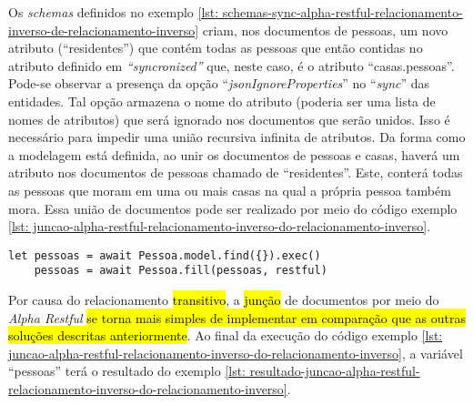 Os \textit{schemas} definidos no exemplo \ref{lst: schemas-sync-alpha-restful-relacionamento-inverso-de-relacionamento-inverso} criam, nos documentos de pessoas, um novo atributo (``residentes'') que contém todas as pessoas que então contidas no atributo definido em \textit{``syncronized''} que, neste caso, é o atributo ``casas.pessoas''. Pode-se observar a presença da opção ``\textit{jsonIgnoreProperties}'' no ``\textit{sync}'' das entidades. Tal opção armazena o nome do atributo (poderia ser uma lista de nomes de atributos) que será ignorado nos documentos que serão unidos. Isso é necessário para impedir uma união recursiva infinita de atributos. Da forma como a modelagem está definida, ao unir os documentos de pessoas e casas, haverá um atributo nos documentos de pessoas chamado de ``residentes''. Este, conterá todas as pessoas que moram em uma ou mais casas na qual a própria pessoa também mora. Essa união de documentos pode ser realizado por meio do código exemplo \ref{lst: juncao-alpha-restful-relacionamento-inverso-do-relacionamento-inverso}.

\begin{lstlisting}[style=ES6, caption={Junção de Documentos Com o \textit{Alpha Restful}\label{lst: juncao-alpha-restful-relacionamento-inverso-do-relacionamento-inverso}}]
	let pessoas = await Pessoa.model.find({}).exec()
	pessoas = await Pessoa.fill(pessoas, restful)
\end{lstlisting}

Por causa do relacionamento \hl{transitivo}, a \hl{junção} de documentos por meio do \textit{Alpha Restful} \hl{se torna mais simples de implementar em comparação que as outras soluções descritas anteriormente}. Ao final da execução do código exemplo \ref{lst: juncao-alpha-restful-relacionamento-inverso-do-relacionamento-inverso}, a variável ``pessoas'' terá o resultado do exemplo \ref{lst: resultado-juncao-alpha-restful-relacionamento-inverso-do-relacionamento-inverso}.

